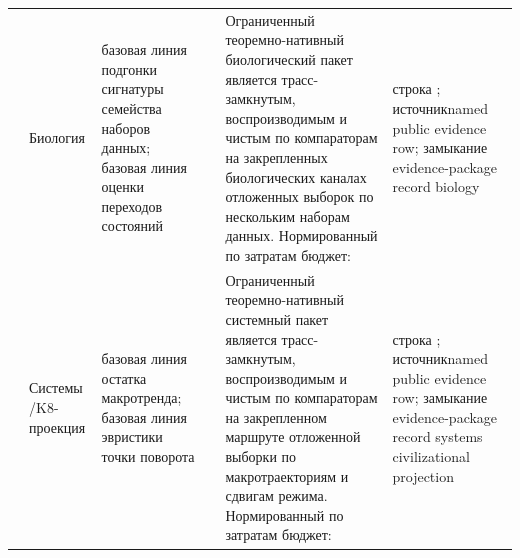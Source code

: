 \begin{longtable}{@{}L{0.14\textwidth}L{0.10\textwidth}L{0.17\textwidth}L{0.10\textwidth}L{0.23\textwidth}L{0.18\textwidth}@{}}
 & Биология & базовая линия подгонки сигнатуры семейства наборов данных; базовая линия оценки переходов состояний &  & Ограниченный теоремно-нативный биологический пакет является трасс-замкнутым, воспроизводимым и чистым по компараторам на закрепленных биологических каналах отложенных выборок по нескольким наборам данных. \allowbreak Нормированный по затратам бюджет:  & строка ; \allowbreak источникnamed public evidence row; \allowbreak замыкание evidence-package record biology \\
 & Системы /\allowbreak K8-проекция & базовая линия остатка макротренда; базовая линия эвристики точки поворота &  & Ограниченный теоремно-нативный системный пакет является трасс-замкнутым, воспроизводимым и чистым по компараторам на закрепленном маршруте отложенной выборки по макротраекториям и сдвигам режима. \allowbreak Нормированный по затратам бюджет:  & строка ; \allowbreak источникnamed public evidence row; \allowbreak замыкание evidence-package record systems civilizational projection \\
\bottomrule
\end{longtable}
\endgroup

